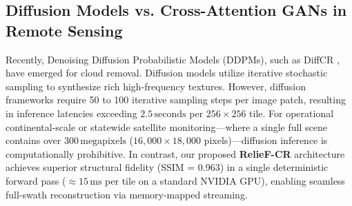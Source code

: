 \subsection{Diffusion Models vs. Cross-Attention GANs in Remote Sensing}
Recently, Denoising Diffusion Probabilistic Models (DDPMs), such as DiffCR \cite{li2024diffcr}, have emerged for cloud removal. Diffusion models utilize iterative stochastic sampling to synthesize rich high-frequency textures. However, diffusion frameworks require 50 to 100 iterative sampling steps per image patch, resulting in inference latencies exceeding $2.5\,\text{seconds}$ per $256\times 256$ tile. For operational continental-scale or statewide satellite monitoring—where a single full scene contains over $300\,\text{megapixels}$ ($16,000\times 18,000$ pixels)—diffusion inference is computationally prohibitive. In contrast, our proposed \textbf{RelieF-CR} architecture achieves superior structural fidelity (SSIM = 0.963) in a single deterministic forward pass ($\approx 15\,\text{ms}$ per tile on a standard NVIDIA GPU), enabling seamless full-swath reconstruction via memory-mapped streaming.
